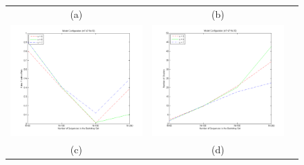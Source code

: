 \begin{figure}[t]
\begin{tabular}{ccc}
    \small (a) & \small (b) \\
    \includegraphics[scale=0.33]{figures/m7-d7-Nc10-fp-rate} &
    \includegraphics[scale=0.33]{figures/m7-d7-Nc10-number-of-clusters} \\
    \small (c) & \small (d) \\

\end{tabular}
\end{figure}

